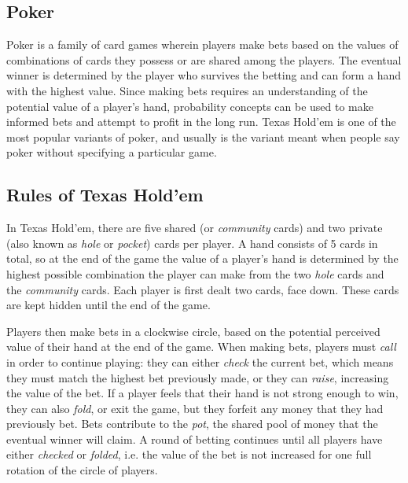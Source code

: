 \begin{enumerate}
\section{Poker}

Poker is a family of card games wherein players make bets based on the
values of combinations of cards they possess or are shared among the
players. The eventual winner is determined by the player who survives
the betting and can form a hand with the highest value. Since making
bets requires an understanding of the potential value of a player's
hand, probability concepts can be used to make informed bets and
attempt to profit in the long run. Texas Hold'em is one of the most
popular variants of poker, and usually is the variant meant when
people say poker without specifying a particular game.

\subsection{Rules of Texas Hold'em}
In Texas Hold'em, there are five shared (or \emph{community} cards) and
two private (also known as \emph{hole} or \emph{pocket}) cards per
player. A hand consists of 5 cards in total, so at the end of the game
the value of a player's hand is determined by the highest possible
combination the player can make from the two \emph{hole} cards and the
\emph{community} cards. Each player is first dealt two cards, face
down. These cards are kept hidden until the end of the game.

Players then make bets in a clockwise circle, based on the potential
perceived value of their hand at the end of the game. When making
bets, players must \emph{call} in order to continue playing: they can
either \emph{check} the current bet, which means they must match the
highest bet previously made, or they can \emph{raise}, increasing the
value of the bet. If a player feels that their hand is not strong
enough to win, they can also \emph{fold}, or exit the game, but they
forfeit any money that they had previously bet. Bets contribute to the
\emph{pot}, the shared pool of money that the eventual winner will
claim. A round of betting continues until all players have either
\emph{checked} or \emph{folded}, i.e. the value of the bet is not
increased for one full rotation of the circle of players.


\end{enumerate}
